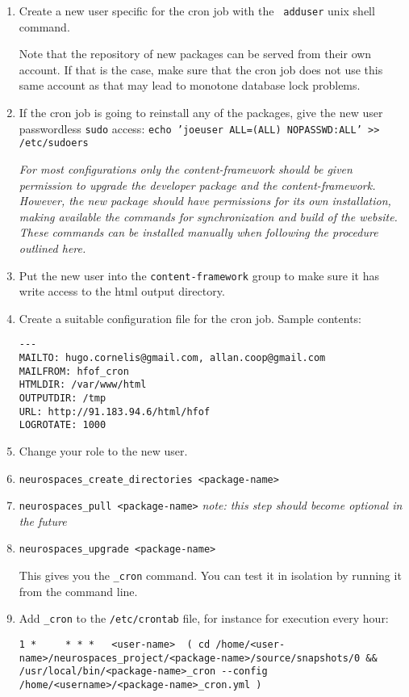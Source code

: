 \documentclass[12pt]{article}
\begin{document}
\begin{enumerate}
\item Create a new user specific for the cron job with the {\tt
    adduser} unix shell command.

  Note that the repository of new packages can be served from their
  own account.  If that is the case, make sure that the cron job does
  not use this same account as that may lead to monotone database lock
  problems.

\item If the cron job is going to reinstall any of the packages, give
  the new user passwordless {\tt sudo} access: {\tt echo 'joeuser
    ALL=(ALL) NOPASSWD:ALL' >> /etc/sudoers}

  {\it For most configurations only the content-framework should be
    given permission to upgrade the developer package and the
    content-framework.  However, the new package should have
    permissions for its own installation, making available the
    commands for synchronization and build of the website.  These
    commands can be installed manually when following the procedure
    outlined here.}

\item Put the new user into the {\tt content-framework} group to make
  sure it has write access to the html output directory.
\item Create a suitable configuration file for the cron job.  Sample
  contents:
\begin{verbatim}
---
MAILTO: hugo.cornelis@gmail.com, allan.coop@gmail.com
MAILFROM: hfof_cron
HTMLDIR: /var/www/html
OUTPUTDIR: /tmp
URL: http://91.183.94.6/html/hfof
LOGROTATE: 1000
\end{verbatim}
\item Change your role to the new user.
\item {\tt neurospaces\_create\_directories <package-name>}
\item {\tt neurospaces\_pull <package-name>} {\it note: this step should
    become optional in the future}
\item {\tt neurospaces\_upgrade <package-name>}

  This gives you the {\tt <package-name>\_cron} command.  You can test it
  in isolation by running it from the command line.
\item Add {\tt <package-name>\_cron} to the {\tt /etc/crontab} file, for
  instance for execution every hour:

\begin{verbatim}
1 *     * * *   <user-name>  ( cd /home/<user-name>/neurospaces_project/<package-name>/source/snapshots/0 && /usr/local/bin/<package-name>_cron --config /home/<username>/<package-name>_cron.yml )
\end{verbatim}
\end{enumerate}
\end{document}
